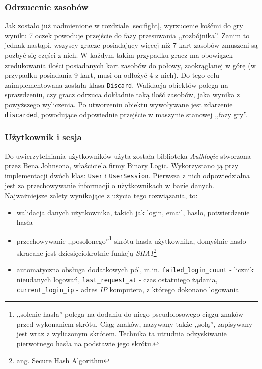 \documentclass[a4paper,12pt]{article}
\begin{document}
\subsubsection{Odrzucenie zasobów}
Jak zostało już nadmienione w rozdziale \ref{sec:fight}, wyrzucenie
kośćmi do gry wyniku 7 oczek powoduje przejście do fazy przesuwania
,,rozbójnika''. Zanim to jednak nastąpi, wszyscy gracze posiadający
więcej niż 7 kart zasobów zmuszeni są pozbyć się części z nich. W
każdym takim przypadku gracz ma obowiązek zredukowania ilości
posiadanych kart zasobów do połowy, zaokrąglanej w górę (w przypadku
posiadania 9 kart, musi on odłożyć 4 z nich). Do tego celu
zaimplementowana została klasa \texttt{Discard}. Walidacja obiektów
polega na sprawdzeniu, czy gracz odrzuca dokładnie taką ilość zasobów,
jaka wynika z powyższego wyliczenia. Po utworzeniu obiektu wywoływane
jest zdarzenie \texttt{discarded}, powodujące odpowiednie przejście w
maszynie stanowej ,,fazy gry''.

\subsubsection{Użytkownik i sesja}
Do uwierzytelniania użytkowników użyta została biblioteka
\emph{Authlogic} stworzona przez Bena Johnsona, właściciela firmy
Binary Logic. Wykorzystano ją przy implementacji dwóch klas:
\texttt{User} i \texttt{UserSession}. Pierwsza z nich odpowiedzialna
jest za przechowywanie informacji o użytkownikach w bazie
danych. Najważniejsze zalety wynikające z użycia tego rozwiązania, to:

\begin{itemize}
\item walidacja danych użytkownika, takich jak login, email, hasło,
  potwierdzenie hasła
\item przechowywanie ,,posolonego''\footnote{,,solenie hasła'' polega
    na dodaniu do niego pseudolosowego ciągu znaków przed wykonaniem
    skrótu. Ciąg znaków, nazywany także ,,solą'', zapisywany jest wraz
    z wyliczonym skrótem. Technika ta utrudnia odzyskiwanie
    pierwotnego hasła na podstawie jego skrótu.} skrótu hasła użytkownika,
  domyślnie hasło skracane jest dziesięciokrotnie funkcją
  \emph{SHA1}\footnote{ang. Secure Hash Algorithm}
\item automatyczna obsługa dodatkowych pól,
  m.in. \texttt{failed\_login\_count} - licznik nieudanych logowań,
  \texttt{last\_request\_at} - czas ostatniego żądania,
  \texttt{current\_login\_ip} - adres \emph{IP} komputera, z którego
  dokonano logowania
\end{itemize}
\end{document}
